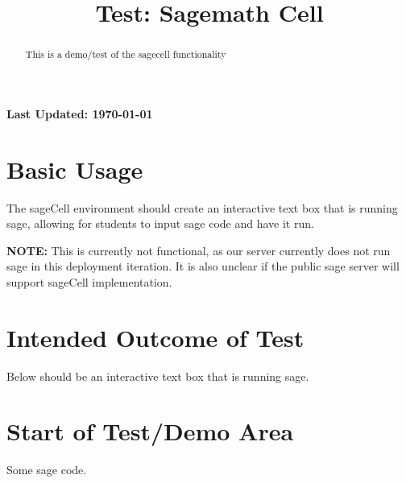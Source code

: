 \documentclass{ximera}
\title{Test: Sagemath Cell}
\begin{document}
\begin{abstract}
    This is a demo/test of the sagecell functionality
\end{abstract}
\maketitle

{{\Huge \bfseries Last Updated: \today}} \\


\section{Basic Usage}
The sageCell environment should create an interactive text box that is running sage, allowing for students to input sage code and have it run.

\textbf{NOTE:} This is currently not functional, as our server currently does not run sage in this deployment iteration.
It is also unclear if the public sage server will support sageCell implementation.

\section{Intended Outcome of Test}
Below should be an interactive text box that is running sage.

\section{Start of Test/Demo Area}
\begin{sageCell}
Some sage code.
\end{sageCell}

\hrulefill
\end{document}
